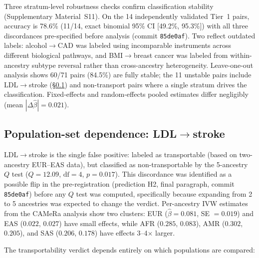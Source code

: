 \documentclass[11pt]{article}
\begin{document}
Three stratum-level robustness checks confirm classification stability (Supplementary Material~S11). On the 14 independently validated Tier~1 pairs, accuracy is 78.6\% (11/14, exact binomial 95\% CI [49.2\%, 95.3\%]) with all three discordances pre-specified before analysis (commit \texttt{85de0af}). Two reflect outdated labels: alcohol$\to$CAD was labeled using incomparable instruments across different biological pathways, and BMI$\to$breast cancer was labeled from within-ancestry subtype reversal rather than cross-ancestry heterogeneity. Leave-one-out analysis shows 60/71 pairs (84.5\%) are fully stable; the 11 unstable pairs include LDL$\to$stroke (\S\ref{sec:realdata-ldl-stroke}) and non-transport pairs where a single stratum drives the classification. Fixed-effects and random-effects pooled estimates differ negligibly (mean $|\Delta\hat\beta| = 0.021$).

\subsection{Population-set dependence: LDL$\to$stroke}
\label{sec:realdata-ldl-stroke}

LDL$\to$stroke is the single false positive: labeled as transportable (based on two-ancestry EUR--EAS data), but classified as non-transportable by the 5-ancestry $Q$ test ($Q = 12.09$, $\text{df} = 4$, $p = 0.017$). This discordance was identified as a possible flip in the pre-registration (prediction H2, final paragraph, commit \texttt{85de0af}) before any $Q$ test was computed, specifically because expanding from 2 to 5 ancestries was expected to change the verdict. Per-ancestry IVW estimates from the CAMeRa analysis \citep{hemani2025camera} show two clusters: EUR ($\hat\beta = 0.081$, SE $= 0.019$) and EAS ($0.022$, $0.027$) have small effects, while AFR ($0.285$, $0.083$), AMR ($0.302$, $0.205$), and SAS ($0.206$, $0.178$) have effects 3--4$\times$ larger.

The transportability verdict depends entirely on which populations are compared:
\end{document}
